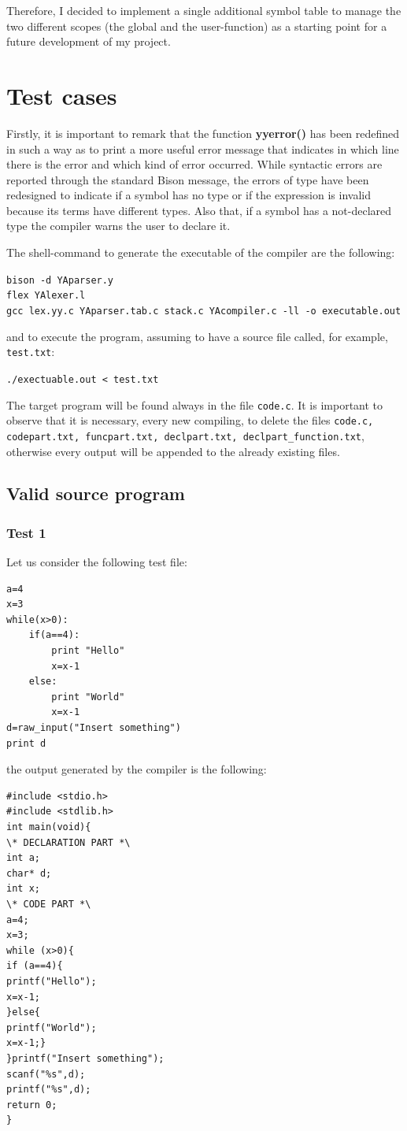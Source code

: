 \documentclass[a4paper,12pt,,titlepage,openright]{report}
\begin{document}
Therefore, I decided to implement a single additional symbol table to manage the two different scopes (the global and the user-function) as a starting point for a future development of my project.

\chapter{Test cases}
Firstly, it is important to remark that the function \textbf{yyerror()} has been redefined in such a way as to print a more useful error message that indicates in which line there is the error and which kind of error occurred.
While syntactic errors are reported through the standard Bison message, the errors of type have been redesigned to indicate if a symbol has no type or if the expression is invalid because its terms have different types. Also that, if a symbol has a not-declared type the compiler warns the user to declare it.

The shell-command to generate the executable of the compiler are the following:
\begin{flushleft}
\texttt{bison -d YAparser.y
\\
flex YAlexer.l
\\
 gcc lex.yy.c YAparser.tab.c stack.c YAcompiler.c -ll -o executable.out
}
\end{flushleft}

and to execute the program, assuming to have a source file called, for example, \texttt{test.txt}:
\begin{flushleft}
\texttt{./exectuable.out < test.txt}
\end{flushleft}

The target program will be found always in the file \texttt{code.c}.
It is important to observe that it is necessary, every new compiling, to delete the files \texttt{code.c, codepart.txt, funcpart.txt, declpart.txt, declpart\_function.txt}, otherwise every output will be appended to the already existing files.
\newpage
\section{Valid source program}
\subsection{Test 1}
Let us consider the following test file:
\begin{Verbatim}
a=4
x=3
while(x>0):
	if(a==4):
		print "Hello"
		x=x-1
	else:
		print "World"
		x=x-1		
d=raw_input("Insert something")
print d
\end{Verbatim}
the output generated by the compiler is the following:
\begin{Verbatim}
#include <stdio.h>
#include <stdlib.h>
int main(void){
\* DECLARATION PART *\
int a;
char* d;
int x;
\* CODE PART *\
a=4;
x=3;
while (x>0){
if (a==4){
printf("Hello");
x=x-1;
}else{
printf("World");
x=x-1;}
}printf("Insert something");
scanf("%s",d);
printf("%s",d);
return 0;
}
\end{Verbatim}
\end{document}
